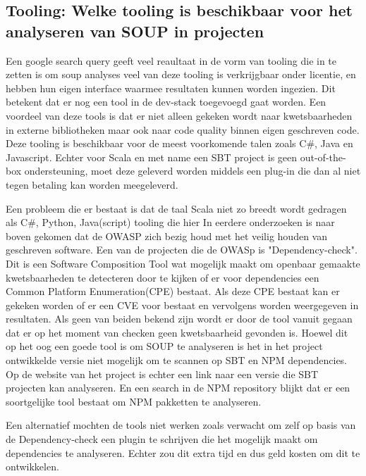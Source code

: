 \subsection{Tooling: Welke tooling is beschikbaar voor het analyseren van SOUP in projecten}\label{subsec:ESTooling}
Een google search query geeft veel reaultaat in de vorm van tooling die in te zetten is om soup analyses veel van deze tooling is verkrijgbaar onder licentie, en hebben hun eigen interface waarmee resultaten kunnen worden ingezien. Dit betekent dat er nog een tool in de dev-stack toegevoegd gaat worden. Een voordeel van deze tools is dat er niet alleen gekeken wordt naar kwetsbaarheden in externe bibliotheken maar ook naar code quality binnen eigen geschreven code. Deze tooling is beschikbaar voor de meest voorkomende talen zoals C#, Java en Javascript. Echter voor Scala en met name een SBT project is geen out-of-the-box ondersteuning, moet deze geleverd worden middels een plug-in die dan al niet tegen betaling kan worden meegeleverd.

Een probleem die er bestaat is dat de taal Scala niet zo breedt wordt gedragen als C#, Python, Java(script) tooling die hier
 In eerdere onderzoeken is naar boven gekomen dat de OWASP zich bezig houd met het veilig houden van geschreven software. Een van de projecten die de OWASp is "Dependency-check". Dit is een Software Composition Tool wat mogelijk maakt om openbaar gemaakte kwetsbaarheden te detecteren door te kijken of er voor dependencies een Common Platform Enumeration(CPE) bestaat. Als deze CPE bestaat kan er gekeken worden of er een CVE voor bestaat en vervolgens worden weergegeven in resultaten. Als geen van beiden bekend zijn wordt er door de tool vanuit gegaan dat er op het moment van checken geen kwetsbaarheid gevonden is. Hoewel dit op het oog een goede tool is om SOUP te analyseren is het in het project ontwikkelde versie niet mogelijk om te scannen op SBT en NPM dependencies. Op de website van het project is echter een link naar een versie die SBT projecten kan analyseren. En een search in de NPM repository blijkt dat er een soortgelijke tool bestaat om NPM pakketten te analyseren.

Een alternatief mochten de tools niet werken zoals verwacht om zelf op basis van de Dependency-check een plugin te schrijven die het mogelijk maakt om dependencies te analyseren. Echter zou dit extra tijd en dus geld kosten om dit te ontwikkelen.

%

